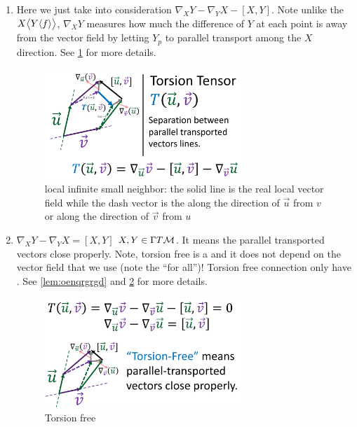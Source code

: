 \documentclass[12pt]{article} %
\begin{document}
\begin{enumerate}[label=\textbf{\arabic*})]
\begin{itemize}
    \end{itemize}
\item {} Here we just take into consideration $ \nabla_XY - \nabla_YX - [X,Y]$.  Note unlike the $ X\big\langle Y\langle f\rangle \big\rangle$, $\nabla_XY$ measures how much the difference of $Y$ at each point is away from the vector field by letting $Y_p$ to parallel transport among the $X$ direction. See \cref{fig:oenfndadg} for more details.
    \begin{figure}[H]
    \centering
    \includegraphics[width=0.7\textwidth]{Figs/e3.jpg}
    \caption{\small local infinite small neighbor: the solid line is the real local vector field while the dash vector is the  along the direction of $\vec{u}$ from $v$ or along the direction of $\vec{v}$ from $u$}
    \label{fig:oenfndadg}
\end{figure}

\item {} $\nabla_XY - \nabla_YX = [X,Y]$  $X,Y\in\Gamma T\mathcal{M}$.  It means the parallel transported vectors close properly. Note, torsion free is a  and it does not depend on the vector field that we use (note the ``for all'')! Torsion free connection only have . See \cref{lem:oenqrgrgd} and \cref{fig:dfadgiqdnfnqdd3q} for more details.
    \begin{figure}[H]
    \centering
    \includegraphics[width=0.7\textwidth]{Figs/e4.jpg}
    \caption{\small Torsion free}
    \label{fig:dfadgiqdnfnqdd3q}
\end{figure}
\end{enumerate}
\end{document}
